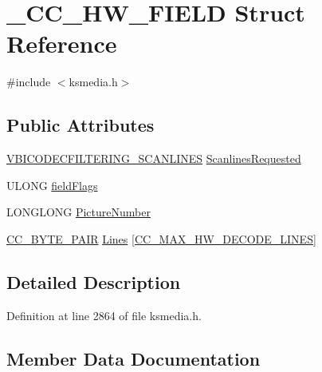 \hypertarget{struct___c_c___h_w___f_i_e_l_d}{}\section{\+\_\+\+C\+C\+\_\+\+H\+W\+\_\+\+F\+I\+E\+LD Struct Reference}
\label{struct___c_c___h_w___f_i_e_l_d}


{\ttfamily \#include $<$ksmedia.\+h$>$}

\subsection*{Public Attributes}
\begin{DoxyCompactItemize}
\item 
\hyperlink{ksmedia_8h_adc03ca4cc884d2dd2dcec672584d8a42}{V\+B\+I\+C\+O\+D\+E\+C\+F\+I\+L\+T\+E\+R\+I\+N\+G\+\_\+\+S\+C\+A\+N\+L\+I\+N\+ES} \hyperlink{struct___c_c___h_w___f_i_e_l_d_a3c80b9397cf44d714e44b016984ba4d4}{Scanlines\+Requested}
\item 
U\+L\+O\+NG \hyperlink{struct___c_c___h_w___f_i_e_l_d_a724194a05007ef9579230c6288d9bbe3}{field\+Flags}
\item 
L\+O\+N\+G\+L\+O\+NG \hyperlink{struct___c_c___h_w___f_i_e_l_d_a0972247c26090bde03f6ebe4b84da98e}{Picture\+Number}
\item 
\hyperlink{ksmedia_8h_a0a70985c6dbf03b38549b2a5990adb0e}{C\+C\+\_\+\+B\+Y\+T\+E\+\_\+\+P\+A\+IR} \hyperlink{struct___c_c___h_w___f_i_e_l_d_a5493febcd75b43d1cd83a71e6fb5ff77}{Lines} \mbox{[}\hyperlink{ksmedia_8h_a61653bfadafc23516121e8d0739bd21a}{C\+C\+\_\+\+M\+A\+X\+\_\+\+H\+W\+\_\+\+D\+E\+C\+O\+D\+E\+\_\+\+L\+I\+N\+ES}\mbox{]}
\end{DoxyCompactItemize}


\subsection{Detailed Description}


Definition at line 2864 of file ksmedia.\+h.



\subsection{Member Data Documentation}
